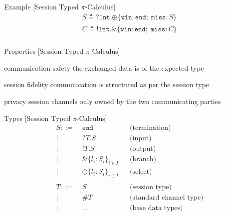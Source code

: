 \documentclass[dvipsnames]{beamer}
\newcommand{\Picalc}{$\pi$-Calculus}
\newcommand{\type}[1]{\mathtt{#1}}
\newcommand{\tend}[0]{\type{end}}
\newcommand{\trecv}[1]{\type{?} #1 \type{.}}
\newcommand{\tsend}[1]{\type{!} #1 \type{.}}
\newcommand{\tbranch}[2]{\type{\&} \{ #1 \}_{#2}}
\newcommand{\tselect}[2]{\type{\oplus} \{ #1 \}_{#2}}
\newcommand{\tchannel}[0]{\type{\#}}
\newcommand{\is}[0]{\triangleq}
\newcommand{\slidetitle}[2]{#2 \hspace*{\fill} [#1]}
\begin{document}
  \begin{frame}{\slidetitle{Session Typed \Picalc{}}{Example}}
    \begin{align*}
      S \is \trecv{\mathtt{Int}} \tselect{\mathtt{win} : \tend ; \; \mathtt{miss} : S}{} \\
      C \is \tsend{\mathtt{Int}} \tbranch{\mathtt{win} : \tend ; \; \mathtt{miss} : C}{} \\
    \end{align*}
  \end{frame}

  \begin{frame}{\slidetitle{Session Typed \Picalc{}}{Properties}}
    \begin{block}{communication safety}
      the exchanged data is of the expected type
    \end{block}
    \begin{block}{session fidelity}
      communication is structured as per the session type
    \end{block}
    \begin{block}{privacy}
      session channels only owned by the two communicating parties
    \end{block}
  \end{frame}

  \begin{frame}{\slidetitle{Session Typed \Picalc{}}{Types}}
    \begin{equation*}
      \begin{aligned}
        S ::=& \; \tend      &&\text{(termination)}    \\ 
        |& \; \trecv{T}S     &&\text{(input)}       \\ 
        |& \; \tsend{T}S     &&\text{(output)}       \\           
        |& \; \tbranch{l_i : S_i}{i \in I} &&\text{(branch)}       \\ 
        |& \; \tselect{l_i : S_i}{i \in I} &&\text{(select)}       \\           
        \\
        T ::=& \; S      &&\text{(session type)} \\
        | & \; \tchannel T && \text{(standard channel type)} \\
        | & \; \ldots      &&\text{(base data types)} \\
      \end{aligned}
    \end{equation*}
  \end{frame}
\end{document}
